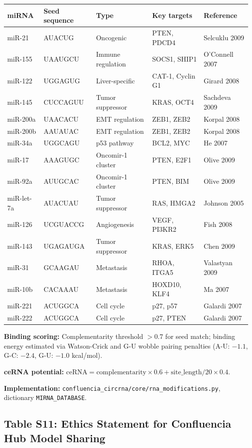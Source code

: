 \begin{tabular}{lllll}
\toprule
\textbf{miRNA} & \textbf{Seed sequence} & \textbf{Type} & \textbf{Key targets} & \textbf{Reference} \\
\midrule
miR-21 & AUACUG & Oncogenic & PTEN, PDCD4 & Selcuklu 2009 \\
miR-155 & UAAUGCU & Immune regulation & SOCS1, SHIP1 & O'Connell 2007 \\
miR-122 & UGGAGUG & Liver-specific & CAT-1, Cyclin G1 & Girard 2008 \\
miR-145 & CUCCAGUU & Tumor suppressor & KRAS, OCT4 & Sachdeva 2009 \\
miR-200a & UAACACU & EMT regulation & ZEB1, ZEB2 & Korpal 2008 \\
miR-200b & AAUAUAC & EMT regulation & ZEB1, ZEB2 & Korpal 2008 \\
miR-34a & UGGCAGU & p53 pathway & BCL2, MYC & He 2007 \\
miR-17 & AAAGUGC & Oncomir-1 cluster & PTEN, E2F1 & Olive 2009 \\
miR-92a & AUUGCAC & Oncomir-1 cluster & PTEN, BIM & Olive 2009 \\
miR-let-7a & AUACUAU & Tumor suppressor & RAS, HMGA2 & Johnson 2005 \\
miR-126 & UCGUACCG & Angiogenesis & VEGF, PI3KR2 & Fish 2008 \\
miR-143 & UGAGAUGA & Tumor suppressor & KRAS, ERK5 & Chen 2009 \\
miR-31 & GCAAGAU & Metastasis & RHOA, ITGA5 & Valastyan 2009 \\
miR-10b & CACAAAU & Metastasis & HOXD10, KLF4 & Ma 2007 \\
miR-221 & ACUGGCA & Cell cycle & p27, p57 & Galardi 2007 \\
miR-222 & ACUGGCA & Cell cycle & p27, PTEN & Galardi 2007 \\
\bottomrule
\end{tabular}

\textbf{Binding scoring:} Complementarity threshold $>0.7$ for seed match; binding energy estimated via Watson-Crick and G-U wobble pairing penalties (A-U: $-1.1$, G-C: $-2.4$, G-U: $-1.0$ kcal/mol).

\textbf{ceRNA potential:} $\text{ceRNA} = \text{complementarity} \times 0.6 + \text{site\_length}/20 \times 0.4$.

\textbf{Implementation:} \texttt{confluencia\_circrna/core/rna\_modifications.py}, dictionary \texttt{MIRNA\_DATABASE}.

\subsection*{Table S11: Ethics Statement for Confluencia Hub Model Sharing}

